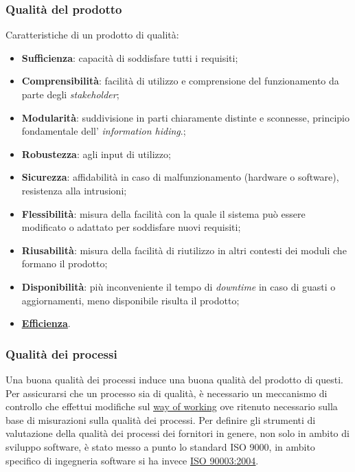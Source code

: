 	\subsubsection{Qualità del prodotto}
	\label{sec:qualitaprodotto}
	Caratteristiche di un prodotto di qualità:
	\begin{itemize}
	\item \textbf{Sufficienza}: capacità di soddisfare tutti i requisiti;
	\item \textbf{Comprensibilità}: facilità di utilizzo e comprensione del funzionamento da parte degli  \emph{stakeholder};
	\item \textbf{Modularità}: suddivisione in parti chiaramente distinte e sconnesse, principio fondamentale dell' \emph{information hiding}.;
	\item \textbf{Robustezza}: agli input di utilizzo;
	\item \textbf{Sicurezza}: affidabilità in caso di malfunzionamento (hardware o software), resistenza alla intrusioni;
	\item \textbf{Flessibilità}: misura della facilità con la quale il sistema può essere modificato o adattato per soddisfare nuovi requisiti;
	\item \textbf{Riusabilità}: misura della facilità di riutilizzo in altri contesti dei moduli che formano il prodotto;
	\item \textbf{Disponibilità}: più inconveniente il tempo di \emph{downtime} in caso di guasti o aggiornamenti, meno disponibile risulta il prodotto;
	\item \textbf{\underline{\hyperref[sec:efficienza]{Efficienza}}}.
	\end{itemize}
	\subsubsection{Qualità dei processi}
	\label{sec:qualitaprocesso}
	Una buona qualità dei processi induce una buona qualità del prodotto di questi. Per assicurarsi che un processo sia di qualità, è necessario un meccanismo di controllo che effettui modifiche sul \underline{\hyperref[sec:wow]{way of working}} ove ritenuto necessario sulla base di misurazioni sulla qualità dei processi. Per definire gli strumenti di valutazione della qualità dei processi dei fornitori in genere, non solo in ambito di sviluppo software, è stato messo a punto lo standard ISO 9000, in ambito specifico di ingegneria software si ha invece \underline{\hyperref[sec:iso90003]{ISO 90003:2004}}.

